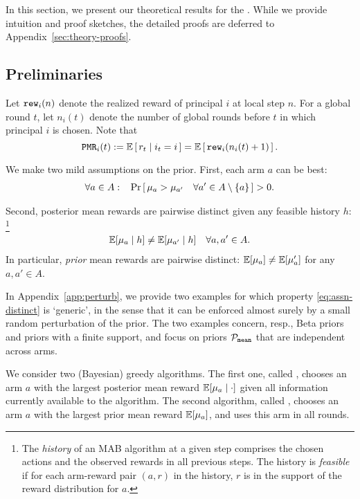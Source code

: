 
In this section, we present our theoretical results for the \TheoryModel. While we provide intuition and proof sketches, the detailed proofs are deferred to Appendix~\ref{sec:theory-proofs}.

\subsection{Preliminaries}
\label{sec:theory-prelims}

 Let $\mathtt{rew}_i(n)$ denote the realized reward of principal $i$ at local step $n$. For a global round $t$, let $n_i(t)$ denote the number of global rounds before $t$ in which principal $i$ is chosen. Note that
    \[ \PMR_i(t):=  \E\sbr{ r_t\mid i_t = i }
        = \E\sbr{ \rew_i(n_i(t)+1) }. \]

 We make two mild assumptions on the prior. First, each arm $a$ can be best:
\begin{align}\label{eq:assn-prob}
\forall a\in A:\;\;\;
\Pr\left[\,\mu_a  > \mu_{a'}
\quad \forall a'\in A\setminus \{a\}\,\right]
> 0.
\end{align}

\noindent Second, posterior mean rewards are pairwise distinct given any feasible history $h$:%
\footnote{The \emph{history} of an MAB algorithm at a given step
  comprises the chosen actions and the observed rewards in all
  previous steps. The history is \emph{feasible} if for each arm-reward pair $(a,r)$ in the history, $r$ is in the support of the reward distribution for $a$.}
\begin{align}\label{eq:assn-distinct}
    \E[\mu_a \mid h] \neq \E[\mu_{a'}\mid h] \quad \forall a,a'\in A.
\end{align}
In particular, \emph{prior} mean rewards are pairwise distinct:
$\E[\mu_a] \neq \E[\mu_a']$ for any $a,a'\in A$.

In Appendix~\ref{app:perturb}, we provide two examples for which property \eqref{eq:assn-distinct} is `generic', in the sense that it can be enforced almost surely by a small random perturbation of the prior. The two examples concern, resp., Beta priors and priors with a finite support, and focus on priors $\mathcal{P}_\mathtt{mean}$ that are independent across arms.

We consider two (Bayesian) greedy algorithms. The first one, called  \DynGreedy, chooses an arm $a$ with the largest posterior mean reward $\E[\mu_a \mid \cdot ]$ given all information currently available to the algorithm. The second algorithm, called \StaticGreedy, chooses an arm $a$ with the largest prior mean reward $\E[\mu_a]$, and uses this arm in all rounds. 


